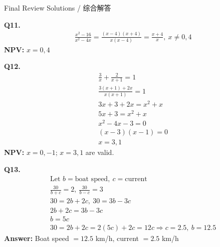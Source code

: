 \documentclass[aspectratio=169]{beamer}
\begin{document}
\begin{frame}{Final Review Solutions / 综合解答}
    \begin{tcolorbox}[colback=lightgray,colframe=primary,title=Solutions]
        \footnotesize
        \textbf{Q11.}
        \begin{align*}
            &\frac{x^2-16}{x^2-4x} = \frac{(x-4)(x+4)}{x(x-4)} = \frac{x+4}{x},\ x\neq0,4
        \end{align*}
        \textbf{NPV:} $x=0,4$
        
        \textbf{Q12.}
        \begin{align*}
            &\frac{3}{x} + \frac{2}{x+1} = 1 \\
            &\frac{3(x+1)+2x}{x(x+1)}=1 \\
            &3x+3+2x=x^2+x \\
            &5x+3=x^2+x \\
            &x^2-4x-3=0 \\
            &(x-3)(x-1)=0 \\
            &x=3,1
        \end{align*}
        \textbf{NPV:} $x=0,-1$; $x=3,1$ are valid.
        
        \textbf{Q13.}
        \begin{align*}
            &\text{Let } b=\text{boat speed},\ c=\text{current} \\
            &\frac{30}{b+c}=2,\ \frac{30}{b-c}=3 \\
            &30=2b+2c,\ 30=3b-3c \\
            &2b+2c=3b-3c \\
            &b=5c \\
            &30=2b+2c=2(5c)+2c=12c \Rightarrow c=2.5,\ b=12.5
        \end{align*}
        \textbf{Answer:} Boat speed $=12.5$ km/h, current $=2.5$ km/h
    \end{tcolorbox}
\end{frame}
\end{document}
